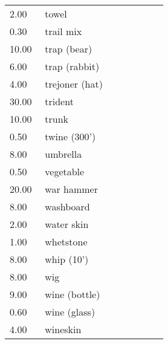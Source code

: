 \begin{tcolorbox}[breakable,boxrule=0pt,title=\textbf{Equipment Costs}]
\begin{xtabular}{@{}p{0.2\linewidth} p{0.7\linewidth}}
2.00 & towel\\
0.30 & trail mix\\
10.00 & trap (bear)\\
6.00 & trap (rabbit)\\
4.00 & trejoner (hat)\\
30.00 & trident\\
10.00 & trunk\\
0.50 & twine (300')\\
8.00 & umbrella\\
0.50 & vegetable\\
20.00 & war hammer\\
8.00 & washboard\\
2.00 & water skin\\
1.00 & whetstone\\
8.00 & whip (10')\\
8.00 & wig\\
9.00 & wine (bottle)\\
0.60 & wine (glass)\\
4.00 & wineskin\\
\end{xtabular}
\end{tcolorbox}